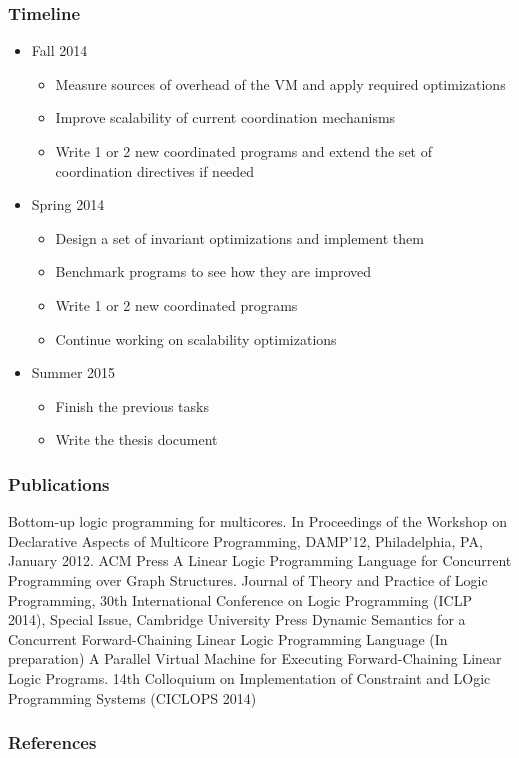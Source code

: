 \documentclass{beamer}
\begin{document}
\begin{frame}[fragile]
   \frametitle{Timeline}
   \begin{itemize}
      \item Fall 2014
      \begin{itemize}
         \item Measure sources of overhead of the VM and apply required optimizations
         \item Improve scalability of current coordination mechanisms
         \item Write 1 or 2 new coordinated programs and extend the set of coordination directives if needed
      \end{itemize}
      \item Spring 2014
      \begin{itemize}
         \item Design a set of invariant optimizations and implement them
         \item Benchmark programs to see how they are improved
         \item Write 1 or 2 new coordinated programs
         \item Continue working on scalability optimizations
      \end{itemize}
      \item Summer 2015
      \begin{itemize}
         \item Finish the previous tasks
         \item Write the thesis document
      \end{itemize}
   \end{itemize}
\end{frame}

\begin{frame}[fragile]
   \frametitle{Publications}
   \begin{thebibliography}{9}
       Bottom-up logic programming for multicores. In Proceedings of the Workshop on Declarative Aspects of Multicore Programming, DAMP'12, Philadelphia, PA, January 2012. ACM Press
      A Linear Logic Programming Language for Concurrent Programming over Graph Structures. Journal of Theory and Practice of Logic Programming, 30th International Conference on Logic Programming (ICLP 2014), Special Issue, Cambridge University Press
       Dynamic Semantics for a Concurrent Forward-Chaining Linear Logic Programming Language (In preparation)
       A Parallel Virtual Machine for Executing Forward-Chaining Linear Logic Programs. 14th Colloquium on Implementation of Constraint and LOgic Programming Systems (CICLOPS 2014)
   \end{thebibliography}
   
\end{frame}

\begin{frame}[allowframebreaks]
  \frametitle{References}
  
  
\end{frame}
\end{document}
